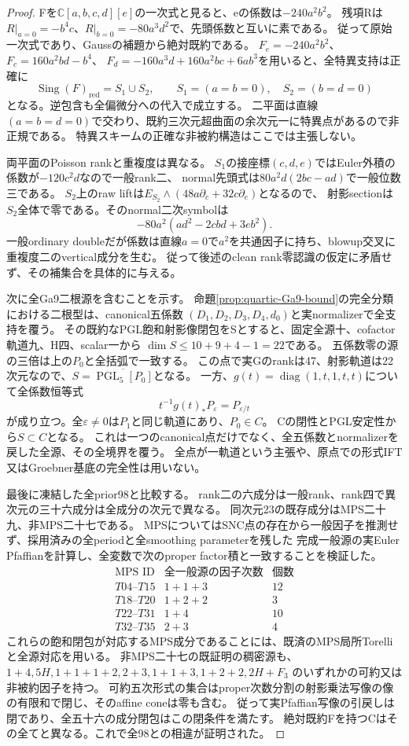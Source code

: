 \documentclass[a4paper,11pt]{ltjsarticle}
\theoremstyle{definition}
\newcommand{\red}{\mathrm{red}}
\newcommand{\PGL}{\operatorname{PGL}}
\begin{document}
\begin{proof}
Fを$\mathbb C[a,b,c,d][e]$の一次式と見ると、eの係数は$-240a^2b^2$。
残項Rは$R|_{a=0}=-b^4c$、$R|_{b=0}=-80a^3d^2$で、先頭係数と互いに素である。
従って原始一次式であり、Gaussの補題から絶対既約である。
$F_e=-240a^2b^2$、$F_c=160a^2bd-b^4$、
$F_d=-160a^3d+160a^2bc+6ab^3$を用いると、全特異支持は正確に
\[
 \operatorname{Sing}(F)_{\red}=S_1\cup S_2,\qquad
 S_1=(a=b=0),\quad S_2=(b=d=0)
\]
となる。逆包含も全偏微分への代入で成立する。
二平面は直線$(a=b=d=0)$で交わり、既約三次元超曲面の余次元一に特異点があるので非正規である。
特異スキームの正確な非被約構造はここでは主張しない。

両平面のPoisson rankと重複度は異なる。
$S_1$の接座標$(c,d,e)$ではEuler外積の係数が$-120c^2d$なので一般rank二、
normal先頭式は$80a^2d(2bc-ad)$で一般位数三である。
$S_2$上のraw liftは$E_{S_2}\wedge(48a\partial_c+32c\partial_e)$となるので、
射影sectionは$S_2$全体で零である。そのnormal二次symbolは
\[
 -80a^2(ad^2-2cbd+3eb^2).
\]
一般ordinary doubleだが係数は直線$a=0$で$a^2$を共通因子に持ち、blowup交叉に重複度二のvertical成分を生む。
従って後述のclean rank零認識の仮定に矛盾せず、その補集合を具体的に与える。

次に全Ga9二根源を含むことを示す。
命題\ref{prop:quartic-Ga9-bound}の完全分類における二根型は、canonical五係数
$(D_1,D_2,D_3,D_4,d_0)$と実normalizerで全支持を覆う。
その既約なPGL飽和射影像閉包をSとすると、固定全源十、cofactor軌道九、H四、scalar一から
$\dim S\le10+9+4-1=22$である。
五係数零の源の三倍は上の$P_0$と全括弧で一致する。
この点で実Gのrankは47、射影軌道は22次元なので、$S=\overline{\PGL_5[P_0]}$となる。
一方、$g(t)=\operatorname{diag}(1,t,1,t,t)$について全係数恒等式
\[
 t^{-1}g(t)_*P_\varepsilon=P_{\varepsilon/t}
\]
が成り立つ。全$\varepsilon\ne0$は$P_1$と同じ軌道にあり、$P_0\in C$。
Cの閉性とPGL安定性から$S\subset C$となる。
これは一つのcanonical点だけでなく、全五係数とnormalizerを戻した全源、その全境界を覆う。
全点が一軌道という主張や、原点での形式IFT又はGroebner基底の完全性は用いない。

最後に凍結した全prior98と比較する。
rank二の六成分は一般rank、rank四で異次元の三十六成分は全成分の次元で異なる。
同次元23の既存成分はMPS二十九、非MPS二十七である。
MPSについてはSNC点の存在から一般因子を推測せず、採用済みの全periodと全smoothing parameterを残した
完成一般源の実Euler Pfaffianを計算し、全変数で次のproper factor積と一致することを検証した。
\[
\begin{array}{c|c|r}
 \text{MPS ID}&\text{全一般源の因子次数}&\text{個数}\\\hline
 T04\text{--}T15&1+1+3&12\\
 T18\text{--}T20&1+2+2&3\\
 T22\text{--}T31&1+4&10\\
 T32\text{--}T35&2+3&4
\end{array}
\]
これらの飽和閉包が対応するMPS成分であることには、既済のMPS局所Torelliと全源対応を用いる。
非MPS二十七の既証明の稠密源も、$1+4,5H,1+1+1+2,2+3,1+1+3,1+2+2,2H+F_3$
のいずれかの可約又は非被約因子を持つ。
可約五次形式の集合はproper次数分割の射影乗法写像の像の有限和で閉じ、そのaffine coneは零も含む。
従って実Pfaffian写像の引戻しは閉であり、全五十六の成分閉包はこの閉条件を満たす。
絶対既約Fを持つCはその全てと異なる。これで全98との相違が証明された。
\end{proof}
\end{document}
